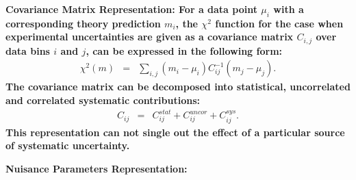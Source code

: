 \begin{description}
\item \bf {Covariance Matrix Representation:} \rm
For a data point  $\mu_i$ with a corresponding theory prediction $m_i$, the $\chi^2$ function for the case when experimental uncertainties are given as 
a covariance matrix $C_{i,j}$ over data bins $i$ and $j$, can be expressed in the following form:
%
\begin{eqnarray}
\chi^2 (m)& = & \sum_{i,j}(m_i-\mu_i)C^{-1}_{ij}(m_j-\mu_j).
\end{eqnarray}
The covariance matrix can be decomposed into statistical, uncorrelated and correlated systematic contributions: 
\begin{eqnarray}
C_{ij}& = & C^{stat}_{ij}+C^{uncor}_{ij}+C^{sys}_{ij}.
\end{eqnarray}
This representation can not single out the effect of a particular
source of systematic uncertainty.

\item \bf{Nuisance Parameters Representation:} \rm
\label{sec:nuisance_representation}


\end{description}
